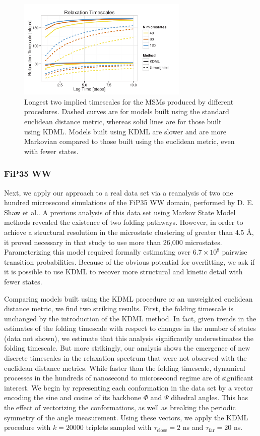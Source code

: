 \documentclass[twocolumn,floatfix,nofootinbib,aps]{revtex4-1}
\begin{document}
\begin{figure}
\centering
\includegraphics[width=3.2in]{../public/figures/timescales.png}
\caption{Longest two implied timescales for the MSMs produced by different procedures. Dashed curves are for models built using the standard euclidean distance metric, whereas solid lines are for those built using KDML. Models built using KDML are slower and are more Markovian compared to those built using the euclidean metric, even with fewer states.}
\end{figure}

\subsubsection{FiP35 WW}
Next, we apply our approach to a real data set via a reanalysis of two one hundred microsecond simulations of the FiP35 WW domain, performed by D. E. Shaw et al.\cite{Shaw2010}. A previous analysis of this data set using Markov State Model methods revealed the existence of two folding pathways\cite{Lane:2011wj}. However, in order to  achieve a structural resolution in the microstate clustering of greater than $4.5$ \AA, it proved necessary in that study to use more than 26,000 microstates. Parameterizing this model required formally estimating over $6.7 \times 10^8$ pairwise transition probabilities. Because of the obvious potential for overfitting, we ask if it is possible to use KDML to recover more structural and kinetic detail with fewer states.

Comparing models built using the KDML procedure or an unweighted euclidean distance metric, we find two striking results. First, the folding timescale is unchanged by the introduction of the KDML method. In fact, given trends in the estimates of the folding timescale with respect to changes in the number of states (data not shown), we estimate that this analysis significantly underestimates the folding timescale. But more strikingly, our analysis shows the emergence of new discrete timescales in the relaxation spectrum that were not observed with the euclidean distance metrics. While faster than the folding timescale, dynamical processes in the hundreds of nanosecond to microsecond regime are of significant interest. We begin by representing each conformation in the data set by a vector encoding the sine and cosine of its backbone $\Phi$ and $\Psi$ dihedral angles. This has the effect of vectorizing the conformations, as well as breaking the periodic symmetry of the angle measurement. Using these vectors, we apply the KDML procedure with $k=20000$ triplets sampled with $\tau_\mathrm{close}= 2$ ns and $\tau_\mathrm{far}=20$ ns.
\end{document}
